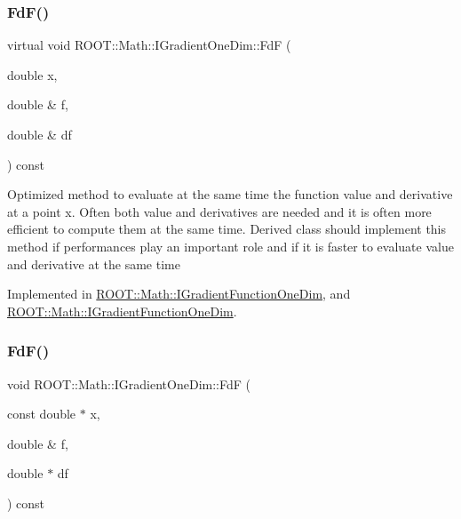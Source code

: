 \subsubsection{\texorpdfstring{FdF()}{FdF()}\hspace{0.1cm}{\footnotesize\ttfamily [2/4]}}
{\footnotesize\ttfamily virtual void R\+O\+O\+T\+::\+Math\+::\+I\+Gradient\+One\+Dim\+::\+FdF (\begin{DoxyParamCaption}\item[{double}]{x,  }\item[{double \&}]{f,  }\item[{double \&}]{df }\end{DoxyParamCaption}) const\hspace{0.3cm}{\ttfamily [pure virtual]}}

Optimized method to evaluate at the same time the function value and derivative at a point x. Often both value and derivatives are needed and it is often more efficient to compute them at the same time. Derived class should implement this method if performances play an important role and if it is faster to evaluate value and derivative at the same time 

Implemented in \mbox{\hyperlink{classROOT_1_1Math_1_1IGradientFunctionOneDim_a01eaedb2ae1dfa5722f11281acf7a72b}{R\+O\+O\+T\+::\+Math\+::\+I\+Gradient\+Function\+One\+Dim}}, and \mbox{\hyperlink{classROOT_1_1Math_1_1IGradientFunctionOneDim_a01eaedb2ae1dfa5722f11281acf7a72b}{R\+O\+O\+T\+::\+Math\+::\+I\+Gradient\+Function\+One\+Dim}}.

\mbox{\label{classROOT_1_1Math_1_1IGradientOneDim_a4d51d8a5bfdb547348b6da33008f6a9e}} 
\subsubsection{\texorpdfstring{FdF()}{FdF()}\hspace{0.1cm}{\footnotesize\ttfamily [3/4]}}
{\footnotesize\ttfamily void R\+O\+O\+T\+::\+Math\+::\+I\+Gradient\+One\+Dim\+::\+FdF (\begin{DoxyParamCaption}\item[{const double $\ast$}]{x,  }\item[{double \&}]{f,  }\item[{double $\ast$}]{df }\end{DoxyParamCaption}) const\hspace{0.3cm}{\ttfamily [inline]}}

